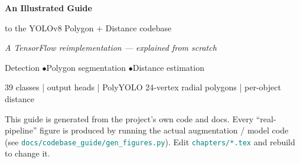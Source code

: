 \documentclass[11pt]{report}
\newcommand{\file}[1]{\textcolor{teal}{\texttt{\small #1}}}
\begin{document}
\begin{titlepage}
\centering
\vspace*{1.2cm}
{\Huge\bfseries\color{accent} An Illustrated Guide\par}
\vspace{4mm}
{\LARGE to the YOLOv8 Polygon + Distance codebase\par}
\vspace{2mm}
{\large\itshape A TensorFlow reimplementation — explained from scratch\par}
\vspace{10mm}


\vspace{12mm}
{\large Detection \quad$\bullet$\quad Polygon segmentation \quad$\bullet$\quad Distance estimation\par}
\vspace{4mm}
{\color{codecom}\small 39 classes \;| output heads \;|\; PolyYOLO 24-vertex radial polygons \;|\; per-object distance}
\vfill
{\small This guide is generated from the project's own code and docs. Every
``real-pipeline'' figure is produced by running the actual augmentation / model
code (see \file{docs/codebase\_guide/gen\_figures.py}). Edit \file{chapters/*.tex} and
rebuild to change it.\par}
\vspace{6mm}
\end{titlepage}

\tableofcontents
\thispagestyle{fancy}













\end{document}
